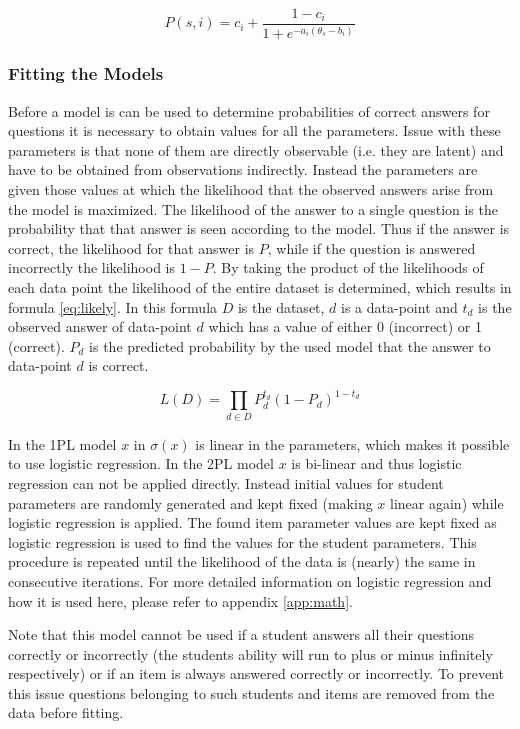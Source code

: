 \documentclass{scrartcl}
\begin{document}
\begin{equation}
\label{eq:3PL}
P(s,i)= c_{i} + \frac{1-c_{i}}{1+e^{-a_{i}(\theta_{s} - b_{i})}}
\end{equation}

\subsubsection{Fitting the Models}
Before a model is can be used to determine probabilities of correct answers for questions it is necessary to obtain values for all the parameters. Issue with these parameters is that none of them are directly observable (i.e. they are latent) and have to be obtained from observations indirectly. Instead the parameters are given those values at which the likelihood that the observed answers arise from the model is maximized. The likelihood of the answer to a single question is the probability that that answer is seen according to the model. Thus if the answer is correct, the likelihood for that answer is $P$, while if the question is answered incorrectly the likelihood is $1-P$. By taking the product of the likelihoods of each data point the likelihood of the entire dataset is determined, which results in formula \ref{eq:likely}. In this formula $D$ is the dataset, $d$ is a data-point and $t_{d}$ is the observed answer of data-point $d$ which has a value of either 0 (incorrect) or 1 (correct). $P_{d}$ is the predicted probability by the used model that the answer to data-point $d$ is correct.

\begin{equation}
\label{eq:likely}
L(D)=\prod_{d \in D} P_{d}^{t_d}  (1- P_{d})^{1-t_d}
\end{equation}

In the 1PL model $x$ in $\sigma(x)$ is linear in the parameters, which makes it possible to use logistic regression. In the 2PL model $x$ is bi-linear and thus logistic regression can not be applied directly. Instead initial values for student parameters are randomly generated and kept fixed (making $x$ linear again) while logistic regression is applied. The found item parameter values are kept fixed as logistic regression is used to find the values for the student parameters. This procedure is repeated until the likelihood of the data is (nearly) the same in consecutive iterations. For more detailed information on logistic regression and how it is used here, please refer to appendix \ref{app:math}.

Note that this model cannot be used if a student answers all their questions correctly or incorrectly (the students ability will run to plus or minus infinitely respectively) or if an item is always answered correctly or incorrectly. To prevent this issue questions belonging to such students and items are removed from the data before fitting.
\end{document}
